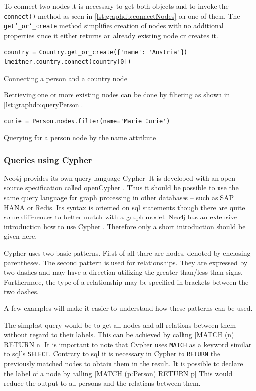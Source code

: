 To connect two nodes it is necessary to get both objects and to invoke the \texttt{connect()} method as seen in \autoref{lst:graphdb:connectNodes} on one of them.
The \texttt{get\char`_or\char`_create} method simplifies creation of nodes with no additional properties since it either returns an already existing node or creates it.
\begin{listing}[H]
\begin{verbatim}
country = Country.get_or_create({'name': 'Austria'})
lmeitner.country.connect(country[0])
\end{verbatim}
\caption{Connecting a person and a country node}
\label{lst:graphdb:connectNodes}
\end{listing}

Retrieving one or more existing nodes can be done by filtering as shown in \autoref{lst:graphdb:queryPerson}.
\begin{listing}[H]
\begin{verbatim}
curie = Person.nodes.filter(name='Marie Curie')
\end{verbatim}
\caption{Querying for a person node by the name attribute}
\label{lst:graphdb:queryPerson}
\end{listing}

\subsubsection{Queries using Cypher}
\label{sec:graphdb:cypher}
Neo4j provides its own query language Cypher. It is developed with an open source specification called openCypher \autocite{openCypher}.
Thus it should be possible to use the same query language for graph processing in other databases -- such as SAP HANA or Redis.
Its syntax is oriented on \gls{sql} statements though there are quite some differences to better match with a graph model.
Neo4j has an extensive introduction how to use Cypher \autocite{neo4j:cypher_introduction}.
Therefore only a short introduction should be given here.

Cypher uses two basic patterns.
First of all there are nodes, denoted by enclosing parentheses.
The second pattern is used for relationships.
They are expressed by two dashes and may have a direction utilizing the greater-than/less-than signs.
Furthermore, the type of a relationship may be specified in brackets between the two dashes.

A few examples will make it easier to understand how these patterns can be used.

The simplest query would be to get all nodes and all relations between them without regard to their labels.
This can be achieved by calling |MATCH (n) RETURN n|
It is important to note that Cypher uses \texttt{MATCH} as a keyword similar to \gls{sql}'s \texttt{SELECT}.
Contrary to \gls{sql} it is necessary in Cypher to \texttt{RETURN} the previously matched nodes to obtain them in the result.
It is possible to declare the label of a node by calling |MATCH (p:Person) RETURN p|
This would reduce the output to all persons and the relations between them.

